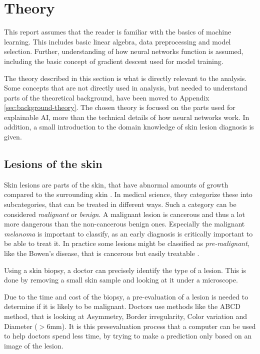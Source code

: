 \chapter{Theory}
This report assumes that the reader is familiar with the basics of machine learning.
This includes basic linear algebra, data preprocessing and model selection.
Further, understanding of how neural networks function is assumed,
including the basic concept of gradient descent used for model training.

The theory described in this section is what is directly relevant to the analysis.
Some concepts that are not directly used in analysis,
but needed to understand parts of the theoretical background,
have been moved to Appendix \ref{sec:background-theory}.
The chosen theory is focused on the parts used for explainable AI, more than the technical details of how neural networks work.
In addition, a small introduction to the domain knowledge of skin lesion diagnosis is given.

\section{Lesions of the skin}
Skin lesions are parts of the skin,
that have abnormal amounts of growth compared to the surrounding skin \cite{dermatologi-laerebogen}.
In medical science, they categorize these into subcategories,
that can be treated in different ways.
Such a category can be considered \textit{malignant} or \textit{benign}.
A malignant lesion is cancerous and thus a lot more dangerous than the non-cancerous benign ones. 
Especially the malignant \textit{melanoma} is important to classify,
as an early diagnosis is critically important to be able to treat it\cite{melanoma-cancer-org}.
In practice some lesions might be classified as \textit{pre-malignant},
like the Bowen's disease,
that is cancerous but easily treatable \cite{nhs-bowens-disease}.

Using a skin biopsy,
a doctor can precisely identify the type of a lesion.
This is done by removing a small skin sample and looking at it under a microscope.

Due to the time and cost of the biopsy,
a pre-evaluation of a lesion is needed to determine if it is likely to be malignant.
Doctors use methods like the ABCD method,
that is looking at Asymmetry, Border irregularity, Color variation and Diameter ($>6\text{mm}$)\cite{dermatologi-laerebogen}.
It is this presevaluation process that a computer can be used to help doctors spend less time,
by trying to make a prediction only based on an image of the lesion.

